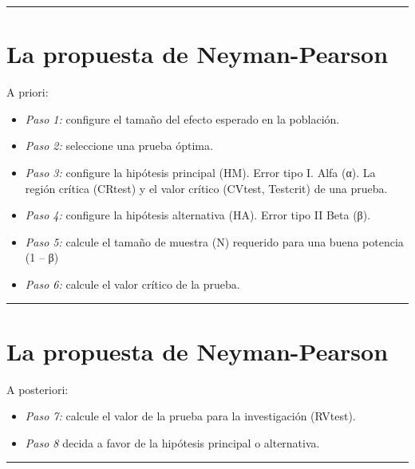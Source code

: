 \documentclass[
]{article}
\begin{document}
\begin{center}\rule{0.5\linewidth}{0.5pt}\end{center}

\hypertarget{la-propuesta-de-neyman-pearson}{%
\section{La propuesta de
Neyman-Pearson}\label{la-propuesta-de-neyman-pearson}}

A priori:

\begin{itemize}
\item
  \emph{Paso 1:} configure el tamaño del efecto esperado en la
  población.
\item
  \emph{Paso 2:} seleccione una prueba óptima.
\item
  \emph{Paso 3:} configure la hipótesis principal (HM). Error tipo I.
  Alfa (α). La región crítica (CRtest) y el valor crítico (CVtest,
  Testcrit) de una prueba.
\item
  \emph{Paso 4:} configure la hipótesis alternativa (HA). Error tipo II
  Beta (β).
\item
  \emph{Paso 5:} calcule el tamaño de muestra (N) requerido para una
  buena potencia (1 -- β)
\item
  \emph{Paso 6:} calcule el valor crítico de la prueba.
\end{itemize}

\begin{center}\rule{0.5\linewidth}{0.5pt}\end{center}

\hypertarget{la-propuesta-de-neyman-pearson-1}{%
\section{La propuesta de
Neyman-Pearson}\label{la-propuesta-de-neyman-pearson-1}}

A posteriori:

\begin{itemize}
\item
  \emph{Paso 7:} calcule el valor de la prueba para la investigación
  (RVtest).
\item
  \emph{Paso 8} decida a favor de la hipótesis principal o alternativa.
\end{itemize}

\begin{center}\rule{0.5\linewidth}{0.5pt}\end{center}
\end{document}
